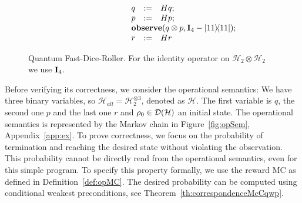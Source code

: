 \documentclass[a4paper,UKenglish,cleveref, autoref, thm-restate]{lipics-v2021}
\begin{document}
\begin{figure}
  \[\begin{array}{lcl}
      q   & \df & H q;\\
      p & \df & H p;\\
      \mathbf{observe}(q \otimes p, \identityOp_4 - \ketbra{11}{11});\hskip-2in {}\\
      r   & \df & H r
    \end{array}
  \]
  \caption{Quantum Fast-Dice-Roller. For the identity operator on $\mathcal{H}_2 \otimes \mathcal{H}_2$ we use $\textbf{I}_4$.}
  \label{fig:fdr}
\end{figure}

Before verifying its correctness, we consider the operational semantics:
We have three binary variables, so $\mathcal{H}_{all} = \mathcal{H}_2 ^{\otimes 3}$, denoted as $\mathcal{H}$. The first variable is $q$, the second one $p$ and the last one $r$ and $\rho_0 \in \mathcal{D}(\mathcal{H})$ an initial state. The operational semantics is represented by the Markov chain in Figure~\ref{fig:opSem}, Appendix~\ref{app:ex}.
To prove correctness, we focus on the probability of termination and reaching the desired state without violating the observation. This probability cannot be directly read from the operational semantics, even for this simple program. To specify this property formally, we use the reward MC as defined in Definition~\ref{def:opMC}. The desired probability can be computed using conditional weakest preconditions, see Theorem~\ref{th:correspondenceMcCqwp}.
\end{document}
